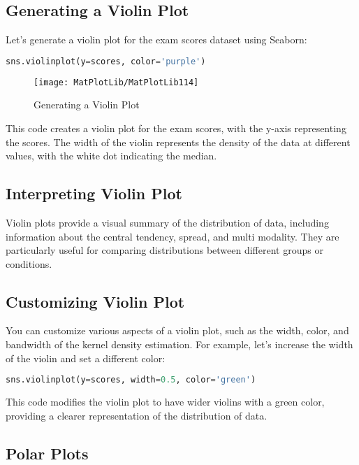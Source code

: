\subsection*{Generating a Violin Plot}

Let's generate a violin plot for the exam scores dataset using Seaborn:

\begin{lstlisting}[language=Python, caption={Generating a Violin Plot}]
	sns.violinplot(y=scores, color='purple')
\end{lstlisting}

\begin{figure}[h]
	\centering
	\texttt{[image: MatPlotLib/MatPlotLib114]}
	\caption{Generating a Violin Plot}\label{Matplotlib114}
\end{figure}

This code creates a violin plot for the exam scores, with the y-axis representing the scores. The width of the violin represents the density of the data at different values, with the white dot indicating the median.

\subsection*{Interpreting Violin Plot}

Violin plots provide a visual summary of the distribution of data, including information about the central tendency, spread, and multi modality. They are particularly useful for comparing distributions between different groups or conditions.

\subsection*{Customizing Violin Plot}

You can customize various aspects of a violin plot, such as the width, color, and bandwidth of the kernel density estimation. For example, let's increase the width of the violin and set a different color:

\begin{lstlisting}[language=Python, caption={Customizing Violin Plot}]
	sns.violinplot(y=scores, width=0.5, color='green')
\end{lstlisting}

This code modifies the violin plot to have wider violins with a green color, providing a clearer representation of the distribution of data.

\subsection*{Polar Plots}

